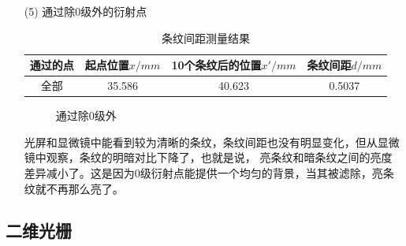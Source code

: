 \documentclass{article}
\begin{document}
\begin{enumerate}
        \item [(5)] 通过除0级外的衍射点 \\
        \begin{table}[htb]
            \centering
            \begin{tabular}{|c|c|c|c|}
                \hline
                通过的点 & 起点位置$x/mm$ & 10个条纹后的位置$x'/mm$ & 条纹间距$d/mm$ \\
                \hline
                全部 & 35.586 & 40.623 & 0.5037 \\
                \hline
            \end{tabular}
            \caption{条纹间距测量结果}
        \end{table}
        \begin{figure}[h]
            \centering
            \caption{通过除0级外}
        \end{figure}

        光屏和显微镜中能看到较为清晰的条纹，条纹间距也没有明显变化，但从显微镜中观察，条纹的明暗对比下降了，也就是说，
        亮条纹和暗条纹之间的亮度差异减小了。这是因为0级衍射点能提供一个均匀的背景，当其被滤除，亮条纹就不再那么亮了。
    \end{enumerate}

    \subsection{二维光栅}
\end{document}
